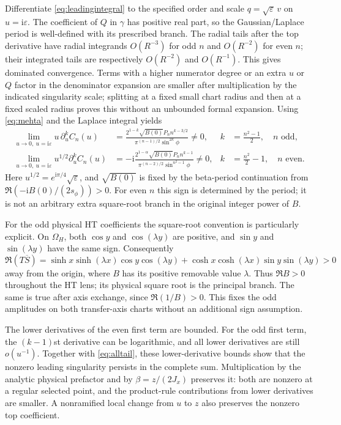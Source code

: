 \documentclass[11pt]{article}
\numberwithin{equation}{section}
\theoremstyle{definition}
\newcommand{\ii}{\mathrm i}
\newcommand{\eps}{\varepsilon}
\newcommand{\OH}{\Omega_H}
\begin{document}
Differentiate \eqref{eq:leadingintegral} to the specified order and
scale $q=\sqrt\eps\,v$ on $u=\ii\eps$. The coefficient of $Q$ in
$\gamma$ has positive real part, so the Gaussian/Laplace period is
well-defined with its prescribed branch. The radial tails after the
top derivative have radial integrands $O(R^{-3})$ for odd $n$ and
$O(R^{-2})$ for even $n$; their integrated tails are respectively
$O(R^{-2})$ and $O(R^{-1})$. This gives dominated convergence.
Terms with a higher numerator
degree or an extra $u$ or $Q$ factor in the denominator expansion are
smaller after multiplication by the indicated singularity scale;
splitting at a fixed small chart radius and then at a fixed scaled
radius proves this without an unbounded formal expansion.
Using \eqref{eq:mehta} and the Laplace integral yields
\begin{align}
 \lim_{u\to0,\ u=\ii\eps}u\,\partial_u^kC_n(u)
 &=\frac{2^{1-k}\sqrt{B(0)}P_n n^{k-3/2}}
        {\pi^{(n-1)/2}\sin^{2k}\phi}\ne0,
 &k&=\frac{n^2-1}{2},\quad n\text{ odd},\label{eq:oddfirst}\\
 \lim_{u\to0,\ u=\ii\eps}u^{1/2}\partial_u^kC_n(u)
 &=-\ii\frac{2^{1-\alpha}\sqrt{B(0)}P_n n^{k-1}}
        {\pi^{(n-2)/2}\sin^{n^2-1}\phi}\ne0,
 &k&=\frac{n^2}{2}-1,\quad n\text{ even}.\label{eq:evenfirst}
\end{align}
Here $u^{1/2}=e^{\ii\pi/4}\sqrt\eps$, and $\sqrt{B(0)}$ is fixed
by the beta-period continuation from
$\Re(-\ii B(0)/(2s_\phi))>0$. For even $n$ this sign is determined
by the period; it is not an arbitrary extra square-root branch in the
original integer power of $B$.

For the odd physical HT coefficients the square-root convention is
particularly explicit. On $\OH$, both $\cos y$ and $\cos(\lambda y)$
are positive, and $\sin y$ and $\sin(\lambda y)$ have the same sign.
Consequently
\[
 \Re(T\overline S)=\sinh x\sinh(\lambda x)\cos y\cos(\lambda y)
 +\cosh x\cosh(\lambda x)\sin y\sin(\lambda y)>0
\]
away from the origin, where $B$ has its positive removable value
$\lambda$. Thus $\Re B>0$ throughout the HT lens; its physical square
root is the principal branch. The same is true after axis exchange,
since $\Re(1/B)>0$. This fixes the odd amplitudes on both transfer-axis
charts without an additional sign assumption.

The lower derivatives of the even first term are bounded. For the odd
first term, the $(k-1)$st derivative can be logarithmic, and all lower
derivatives are still $o(u^{-1})$. Together with
\eqref{eq:alltail}, these lower-derivative bounds show that the nonzero
leading singularity persists in the complete sum. Multiplication by the analytic
physical prefactor and by $\beta=z/(2J_x)$ preserves it: both are
nonzero at a regular selected point, and the product-rule contributions
from lower derivatives are smaller. A nonramified local change from
$u$ to $z$ also preserves the nonzero top coefficient.
\end{document}
